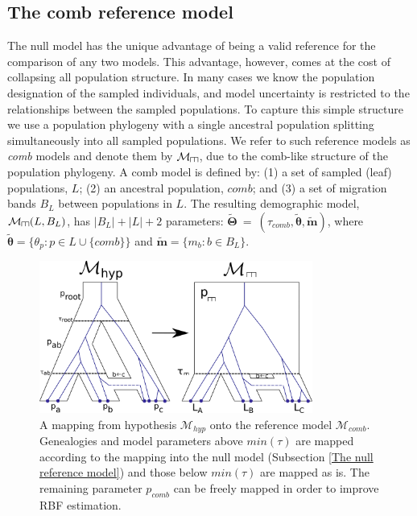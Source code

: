 \documentclass[11pt]{article}
\newcommand{\vect}[1]{\boldsymbol{\mathbf{#1}}}
\newcommand{\M}{\mathcal{M}}
\newcommand{\T}{\vect{\Theta}}
\newcommand{\Tref}{\widetilde{\T}}
\newcommand{\1}{\mathbbm{1}}
\def\comb{\rotatebox[origin=c]{90}{$\exists$}}
\newcommand{\Mcomb}{\M_{\comb}}
\newcommand{\thetas}{\vect\theta}
\newcommand{\migs}{\vect{m}}
\newcommand{\tacomb}{\tau_{comb}}
\def\comb{\rotatebox[origin=c]{90}{$\exists$}}
\begin{document}
\subsection{The comb reference model} \label{The comb reference model} 


The null model has the unique advantage of being a valid reference for the comparison of any two models.
This advantage, however, comes at the cost of collapsing all population structure.
%
In many cases we know the population designation of the sampled individuals, and model uncertainty is restricted to the relationships between the sampled populations.
%
To capture this simple structure we use a population phylogeny with a single ancestral population splitting simultaneously into all sampled populations.
We refer to such reference models as {\em comb} models and denote them by $\Mcomb$,  due to the comb-like structure of the population phylogeny.
%
A comb model is defined by: (1) a set of sampled (leaf) populations, $L$; (2) an ancestral population, $comb$; and (3) a set of migration bands $B_L$ between populations in $L$.
%
The resulting demographic model, $\Mcomb(L,B_L)$, has $|B_L|+|L|+2$ parameters: $\Tref ~=~ (\tacomb, \widetilde{\thetas},\widetilde{\migs})$,
where $\widetilde{\thetas}=\{\theta_p:p\in L\cup \{comb\}\}$ and $\widetilde{\migs} = \{m_b:b\in B_L\}$.
%

\begin{figure}[h]
\centering
\includegraphics[width=0.8\textwidth]
{comb_model_with_migration_single_genealogy}
\captionsetup{width=.8\textwidth}
\caption{A mapping from hypothesis $\M_{hyp}$ onto the 
reference model $\M_{comb}$. Genealogies and model parameters 
above $min(\tau)$ are mapped according to the mapping into the 
null model (Subsection \ref{The null reference model}) and those below $min(\tau)$ are mapped as is. The 
remaining parameter $p_{comb}$ can be freely mapped in order to improve RBF estimation. }
\label{fig:comb_model_with_migration_single_genealogy}
\end{figure}
\end{document}
